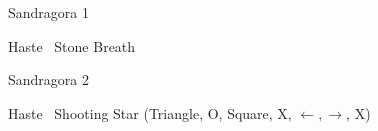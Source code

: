 \begin{battle}{Sandragora 1}
\begin{itemize}
	\tidusf Haste \kimahri
	\kimahrif \od\ Stone Breath
\end{itemize}
\end{battle}
\begin{battle}{Sandragora 2}
\begin{itemize}
	\tidusf Haste \auron
	\auronf \od\ Shooting Star (Triangle, O, Square, X, $\leftarrow, \rightarrow$, X)
\end{itemize}
\end{battle}